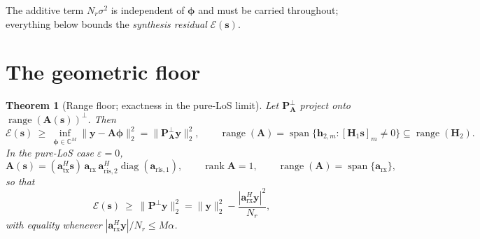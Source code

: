 \documentclass[11pt]{article}
\newtheorem{theorem}{Theorem}
\theoremstyle{remark}
\begin{document}
The additive term $N_r\sigma^2$ is independent of $\boldsymbol{\phi}$ and must be
carried throughout; everything below bounds the \emph{synthesis residual}
$\mathcal{E}(\mathbf{s})$.

\section{The geometric floor}

\begin{theorem}[Range floor; exactness in the pure-LoS limit]
\label{thm:floor}
Let $\mathbf{P}^{\perp}_{\mathbf{A}}$ project onto
$\operatorname{range}(\mathbf{A}(\mathbf{s}))^{\perp}$. Then
\begin{equation}
\mathcal{E}(\mathbf{s})\ \ge\
\inf_{\boldsymbol{\phi}\in\mathbb{C}^{M}}
 \|\mathbf{y}-\mathbf{A}\boldsymbol{\phi}\|_2^2
=\bigl\|\mathbf{P}^{\perp}_{\mathbf{A}}\mathbf{y}\bigr\|_2^2,
\qquad
\operatorname{range}(\mathbf{A})
=\operatorname{span}\bigl\{\mathbf{h}_{2,m}:[\mathbf{H}_1\mathbf{s}]_m\neq0\bigr\}
\subseteq\operatorname{range}(\mathbf{H}_2).
\label{eq:rangefloor}
\end{equation}
In the pure-LoS case $\varepsilon=0$,
\begin{equation}
\mathbf{A}(\mathbf{s})
=(\mathbf{a}_{\mathrm{tx}}^{H}\mathbf{s})\,\mathbf{a}_{\mathrm{rx}}\,
 \mathbf{a}_{\mathrm{ris},2}^{H}
 \operatorname{diag}(\mathbf{a}_{\mathrm{ris},1}),
\qquad
\operatorname{rank}\mathbf{A}=1,
\qquad
\operatorname{range}(\mathbf{A})=\operatorname{span}\{\mathbf{a}_{\mathrm{rx}}\},
\label{eq:rank1}
\end{equation}
so that
\begin{equation}
\mathcal{E}(\mathbf{s})\ \ge\
\bigl\|\mathbf{P}^{\perp}\mathbf{y}\bigr\|_2^2
=\|\mathbf{y}\|_2^2-\frac{|\mathbf{a}_{\mathrm{rx}}^{H}\mathbf{y}|^2}{N_r},
\label{eq:losfloor}
\end{equation}
with \emph{equality} whenever
$|\mathbf{a}_{\mathrm{rx}}^{H}\mathbf{y}|/N_r\le M\alpha$.
\end{theorem}
\end{document}
